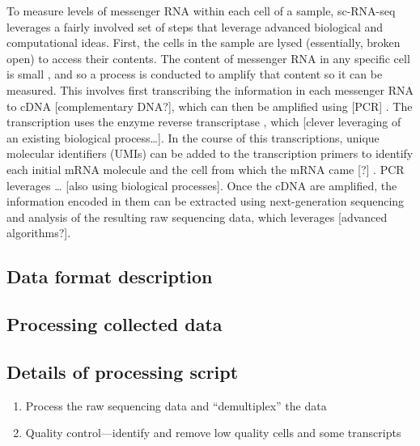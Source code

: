 \documentclass[
]{book}
\begin{document}
To measure levels of messenger RNA within each cell of a sample, sc-RNA-seq
leverages a fairly involved set of steps that leverage advanced biological and
computational ideas. First, the cells in the sample are lysed (essentially,
broken open) to access their contents. The content of messenger RNA in any
specific cell is small \citep{brennecke2013accounting}, and so a process is conducted
to amplify that content so it can be measured. This involves first transcribing
the information in each messenger RNA to cDNA {[}complementary DNA?{]}, which can
then be amplified using {[}PCR{]} \citep{haque2017practical}. The transcription uses the
enzyme reverse transcriptase \citep{haque2017practical}, which {[}clever leveraging of
an existing biological process\ldots{]}. In the course of this transcriptions, unique
molecular identifiers (UMIs) can be added to the transcription primers to
identify each initial mRNA molecule and the cell from which the mRNA came {[}?{]}
\citep{haque2017practical}. PCR leverages \ldots{} {[}also using biological processes{]}. Once
the cDNA are amplified, the information encoded in them can be extracted using
next-generation sequencing \citep{haque2017practical} and analysis of the resulting
raw sequencing data, which leverages {[}advanced algorithms?{]}.

\hypertarget{data-format-description-1}{%
\subsection{Data format description}\label{data-format-description-1}}

\hypertarget{processing-collected-data-3}{%
\subsection{Processing collected data}\label{processing-collected-data-3}}

\hypertarget{details-of-processing-script-3}{%
\subsection{Details of processing script}\label{details-of-processing-script-3}}

\begin{enumerate}
\def\labelenumi{\arabic{enumi}.}
\item
  Process the raw sequencing data and ``demultiplex'' the data
\item
  Quality control---identify and remove low quality cells and some transcripts
\end{enumerate}
\end{document}
